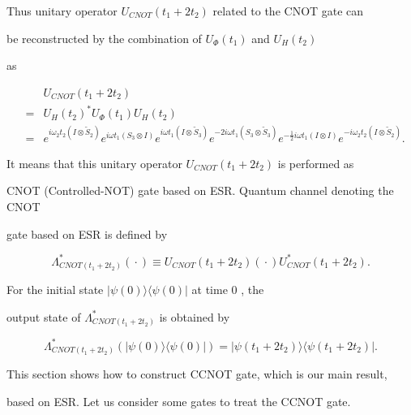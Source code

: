 Thus unitary operator $U_{CNOT}(t_{1}+2t_{2})$ related to the CNOT gate can

be reconst\-ructed by the combination of $U_{\Phi }(t_{1})$ and $U_{H}(t_{2})$

as 

\begin{eqnarray*}

&&U_{CNOT}(t_{1}+2t_{2}) \\

&=&U_{H}(t_{2})^{\ast }U_{\Phi }(t_{1})U_{H}(t_{2}) \\

&=&e^{i\omega _{2}t_{2}(I\otimes \tilde{S}_{2})}e^{i\omega

t_{1}(S_{3}\otimes I)}e^{i\omega t_{1}(I\otimes \tilde{S}_{3})}e^{-2i\omega

t_{1}(S_{3}\otimes \tilde{S}_{3})}e^{-\frac{1}{2}i\omega t_{1}(I\otimes

I)}e^{-i\omega _{2}t_{2}(I\otimes \tilde{S}_{2})}.

\end{eqnarray*}%

It means that this unitary operator $U_{CNOT}(t_{1}+2t_{2})$ is performed as

CNOT (Controlled-NOT) gate based on ESR. Quantum channel denoting the CNOT

gate based on ESR is defined by 

\[

\Lambda _{CNOT(t_{1}+2t_{2})}^{\ast }({}\cdot{} )\equiv

U_{CNOT}(t_{1}+2t_{2})({}\cdot{} )U_{CNOT}^{\ast }(t_{1}+2t_{2}). 

\]%

For the initial state $|\psi (0)\rangle \langle \psi (0)|$ at time $0$ , the

output state of $\Lambda _{CNOT(t_{1}+2t_{2})}^{\ast }$ is obtained by 

\[

\Lambda _{CNOT(t_{1}+2t_{2})}^{\ast }(|\psi (0)\rangle \langle \psi

(0)|)=|\psi (t_{1}+2t_{2})\rangle \langle \psi (t_{1}+2t_{2})|. 

\]




This section shows how to construct CCNOT gate, which is our main result,

based on ESR. Let us consider some gates to treat the CCNOT gate. 

